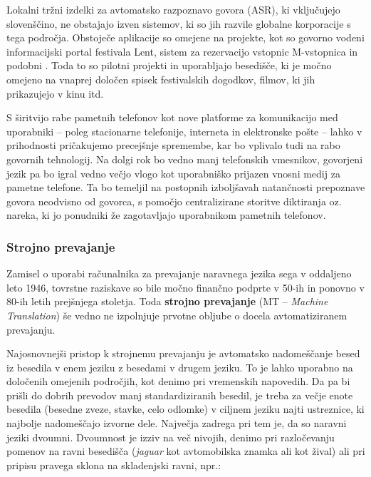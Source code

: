 \begin{multicols}{2}
Lokalni tržni izdelki za avtomatsko razpoznavo go\-vora (ASR), ki vključujejo slovenščino, ne obstajajo izven sistemov, ki so jih razvile globalne kor\-poracije s tega področja. Obstoječe aplikacije so omejene na projekte, kot so govorno vodeni informacijski portal festivala Lent, \cite{Lent1} sistem za rezervacijo vstopnic M-vstopnica  in podobni \cite{Kolosej1}. Toda to so pilotni projekti in uporabljajo besedišče, ki je močno omejeno na vnaprej določen spisek festivalskih dogodkov, filmov, ki jih prikazujejo v kinu itd.

S širitvijo rabe pametnih telefonov kot nove platforme za komunikacijo med uporabniki – poleg stacionarne telefonije, interneta in elektronske pošte – lahko v prihodnosti pričakujemo precejšnje spremembe, kar bo vplivalo tudi na rabo govornih tehnologij. Na dolgi rok bo vedno manj telefonskih vmesnikov, govorjeni jezik pa bo igral vedno večjo vlogo kot uporabniško prijazen vnosni medij za pametne telefone. Ta bo temeljil na postopnih izboljšavah natančnosti prepoznave govora neodvisno od govorca, s pomočjo centralizirane storitve diktiranja oz. nareka, ki jo ponudniki že zagotavljajo uporabnikom pametnih telefonov.

\subsubsection{Strojno prevajanje}

Zamisel o uporabi računalnika za prevajanje naravnega jezika sega v oddaljeno leto 1946, tovrstne raziskave so bile močno finančno podprte v 50-ih in ponovno v 80-ih letih prejšnjega stoletja. Toda \textbf{strojno prevajanje} (MT – \textit{Machine Translation}) še vedno ne izpolnjuje prvotne obljube o docela avtomatiziranem prevajanju.


Najosnovnejši pristop k strojnemu prevajanju je avtomatsko nadomeščanje besed iz besedila v enem jeziku z besedami v drugem jeziku. To je lahko uporabno na določenih omejenih področjih, kot denimo pri vremenskih napovedih. Da pa bi prišli do dobrih prevodov manj standardiziranih besedil, je treba za večje enote besedila (besedne zveze, stavke, celo odlomke) v ciljnem jeziku najti ustreznice, ki najbolje nadomeščajo izvorne dele. Največja zadrega pri tem je, da so naravni jeziki dvoumni. Dvoumnost je izziv na več nivojih, denimo pri razločevanju pomenov na ravni besedišča (\textit{jaguar} kot avtomobilska znamka ali kot žival) ali pri pripisu pravega sklona na skladenjski ravni, npr.:


\end{multicols}
